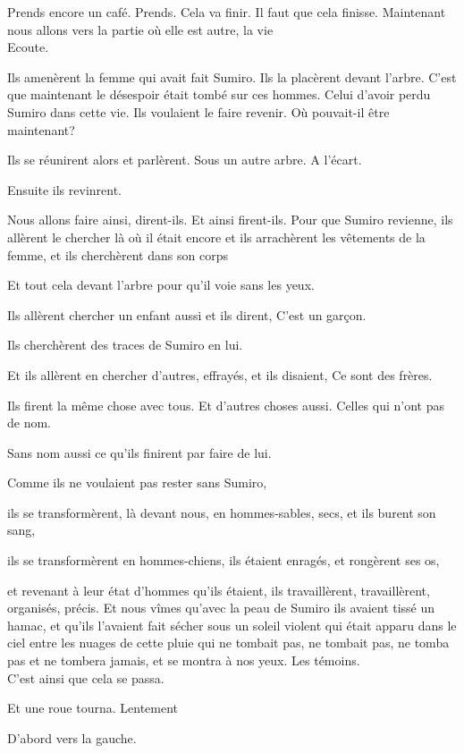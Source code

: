 Prends encore un café. Prends. Cela va finir. Il faut que cela finisse.
Maintenant nous allons vers la partie où elle est autre, la vie\\

Ecoute.

Ils amenèrent la femme qui avait fait Sumiro. Ils la placèrent devant
l'arbre. C'est que maintenant le désespoir était tombé sur ces hommes.
Celui d'avoir perdu Sumiro dans cette vie. Ils voulaient le faire
revenir. Où pouvait-il être maintenant?

Ils se réunirent alors et parlèrent. Sous un autre arbre. A l'écart.

Ensuite ils revinrent.

Nous allons faire ainsi, dirent-ils. Et ainsi firent-ils. Pour que
Sumiro revienne, ils allèrent le chercher là où il était encore et ils
arrachèrent les vêtements de la femme, et ils cherchèrent dans son corps

Et tout cela devant l'arbre pour qu'il voie sans les yeux.

Ils allèrent chercher un enfant aussi et ils dirent, C'est un garçon.

Ils cherchèrent des traces de Sumiro en lui.

Et ils allèrent en chercher d'autres, effrayés, et ils disaient, Ce sont
des frères.

Ils firent la même chose avec tous. Et d'autres choses aussi. Celles qui
n'ont pas de nom.

Sans nom aussi ce qu'ils finirent par faire de lui.

Comme ils ne voulaient pas rester sans Sumiro,

ils se transformèrent, là devant nous, en hommes-sables, secs, et ils
burent son sang,

ils se transformèrent en hommes-chiens, ils étaient enragés, et
rongèrent ses os,

et revenant à leur état d'hommes qu'ils étaient, ils travaillèrent,
travaillèrent, organisés, précis. Et nous vîmes qu'avec la peau de
Sumiro ils avaient tissé un hamac, et qu'ils l'avaient fait sécher sous
un soleil violent qui était apparu dans le ciel entre les nuages de
cette pluie qui ne tombait pas, ne tombait pas, ne tomba pas et ne
tombera jamais, et se montra à nos yeux. Les témoins.\\

C'est ainsi que cela se passa.

Et une roue tourna. Lentement

D'abord vers la gauche.

